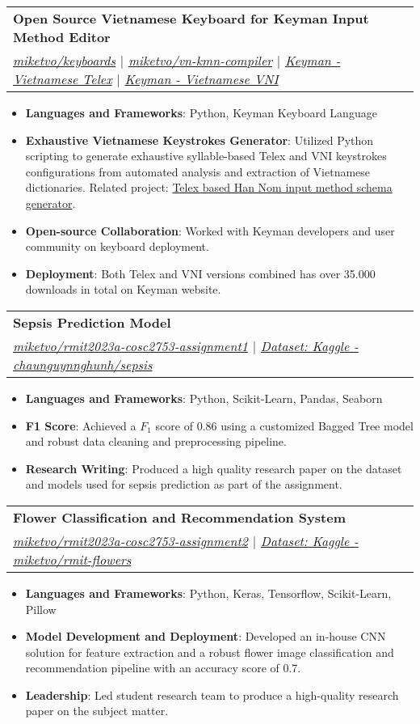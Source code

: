 \documentclass[a4paper,11pt]{article}
\makeatletter
\newcommand{\resumeItem}[2]{
  \item\small{
    \textbf{#1}{: #2 \vspace{-2pt}}
  }
}
\newcommand{\resumeSubheading}[4]{
  \vspace{-1pt}\item
    \begin{tabular*}{0.97\textwidth}{l@{\extracolsep{\fill}}r}
      \textbf{#1} & #2 \\
      \textit{\small#3} & \textit{\small #4} \\
    \end{tabular*}\vspace{-5pt}
}
\newcommand{\resumeItemListStart}{\begin{itemize}}
\newcommand{\resumeItemListEnd}{\end{itemize}\vspace{-5pt}}
\makeatother
\begin{document}
    \resumeSubheading
      {Open Source Vietnamese Keyboard for Keyman Input Method Editor}{}
      {\href{https://github.com/miketvo/keyboards}{\faGithub\space miketvo/keyboards} $|$ \href{https://github.com/miketvo/vn-kmn-compiler}{\faGithub\space miketvo/vn-kmn-compiler} $|$ \href{https://keyman.com/keyboards/vietnamese_telex}{\faGlobe\space Keyman - Vietnamese Telex} $|$ \href{https://keyman.com/keyboards/vietnamese_vni}{\faGlobe\space Keyman - Vietnamese VNI}}{}
      \resumeItemListStart
        \resumeItem{Languages and Frameworks}
          {Python, Keyman Keyboard Language}
        \resumeItem{Exhaustive Vietnamese Keystrokes Generator}
          {Utilized Python scripting to generate exhaustive syllable-based Telex and VNI keystrokes configurations from automated analysis and extraction of Vietnamese dictionaries. Related project: \href{https://github.com/miketvo/rime-ime-han-nom-data}{\faGithub\space Telex based Han Nom input method schema generator}.}
        \resumeItem{Open-source Collaboration}
          {Worked with Keyman developers and user community on keyboard deployment.}
        \resumeItem{Deployment}
          {Both Telex and VNI versions combined has over 35.000 downloads in total on Keyman website.}
      \resumeItemListEnd
  
    \resumeSubheading
      {Sepsis Prediction Model}{}
      {\href{https://github.com/miketvo/rmit2023a-cosc2753-assignment1}{\faGithub\space miketvo/rmit2023a-cosc2753-assignment1} $|$ \href{https://www.kaggle.com/datasets/chaunguynnghunh/sepsis/}{\faDatabase\space Dataset: Kaggle - chaunguynnghunh/sepsis}}{}
      \resumeItemListStart
        \resumeItem{Languages and Frameworks}
          {Python, Scikit-Learn, Pandas, Seaborn}
        \resumeItem{F1 Score}
          {Achieved a $F_1$ score of 0.86 using a customized Bagged Tree model and robust data cleaning and preprocessing pipeline.}
        \resumeItem{Research Writing}
          {Produced a high quality research paper on the dataset and models used for sepsis prediction as part of the assignment.}
      \resumeItemListEnd

    \resumeSubheading
      {Flower Classification and Recommendation System}{}
      {\href{https://github.com/miketvo/rmit2023a-cosc2753-assignment2}{\faGithub\space miketvo/rmit2023a-cosc2753-assignment2} $|$ \href{https://www.kaggle.com/datasets/miketvo/rmit-flowers/}{\faDatabase\space Dataset: Kaggle - miketvo/rmit-flowers}}{}
      \resumeItemListStart
        \resumeItem{Languages and Frameworks}
          {Python, Keras, Tensorflow, Scikit-Learn, Pillow}
        \resumeItem{Model Development and Deployment}
          {Developed an in-house CNN solution for feature extraction and a robust flower image classification and recommendation pipeline with an accuracy score of 0.7.}
        \resumeItem{Leadership}
          {Led student research team to produce a high-quality research paper on the subject matter.}
      \resumeItemListEnd
\end{document}
